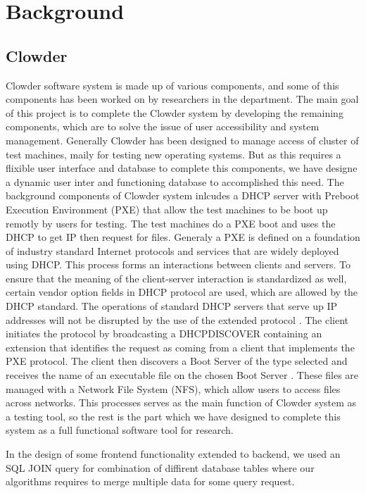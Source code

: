 \chapter{Background}
\label{chap:figtab}
\label{chap}
\section*{Clowder}
Clowder software system is made up of various components, and some of this components has been worked on by researchers in the department. The main goal of this project is to complete the Clowder system by developing the remaining components, which are to solve the issue of user accessibility and system management. Generally Clowder has been designed to manage access of cluster of test machines, maily for testing new operating systems. But as this requires a flixible user interface and database to complete this components, we have designe a dynamic user inter and functioning database to accomplished this need. The background components of Clowder system inlcudes  a  DHCP server with Preboot Execution Environment (PXE)  that allow the test machines to be boot up remotly by users for testing. The test machines do a PXE boot and uses the DHCP to get IP then request for files. 
Generaly a PXE is defined on a foundation of industry standard Internet protocols and services that are widely deployed using DHCP. This process forms an interactions between clients and servers. To ensure that the meaning of the client-server interaction is standardized as well, certain vendor option fields in DHCP protocol are used, which are allowed by the DHCP standard. The operations of standard DHCP servers that serve up IP addresses will not be disrupted by the use of the extended protocol \cite{PXE}.
The client initiates the protocol by broadcasting a DHCPDISCOVER containing an extension that identifies the request as coming from a client that implements the PXE protocol. The client then discovers a Boot Server of the type selected and receives the name of an executable file on the chosen Boot Server 
 \cite{PXE}. These files are managed with a Network File System (NFS), which allow users to access files across networks. This processes serves as the main function of Clowder system as a testing tool, so the rest is the part which we have designed to complete this system as a full functional software tool for research.
 
 In the design of some frontend functionality extended to backend, we used an SQL JOIN query for combination of diffirent database tables where our algorithms requires to merge multiple data for some query request. 



